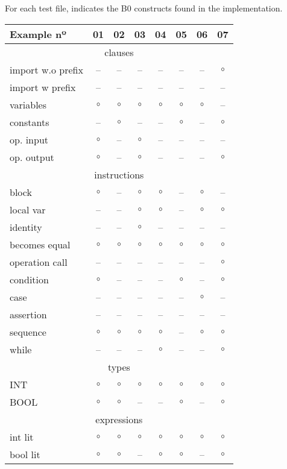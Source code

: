 \documentclass{llncs}
\begin{document}
For each test file, indicates the B0 constructs found in the implementation.
\begin{center}
\newcommand{\no}[0]{--}
\newcommand{\yes}[0]{$\circ$}
\begin{tabular}{|l|c|c|c|c|c|c|c|}
\hline
Example nº & 01 & 02 & 03 & 04 & 05 & 06 & 07 \\
\hline
\hline
\multicolumn{8}{|c|}{clauses} \\
\hline
import w.o prefix & \no & \no & \no & \no & \no & \no & \yes \\
import w prefix & \no & \no & \no & \no & \no & \no & \no \\
variables & \yes & \yes & \yes & \yes & \yes & \yes & \no \\
constants & \no & \yes & \no & \no & \yes & \no & \yes \\
op. input & \yes & \no & \yes & \no & \no & \no & \no \\
op. output & \yes & \no & \yes & \no & \no & \no & \yes \\
\hline
\multicolumn{8}{|c|}{instructions} \\
\hline
block & \yes & \no & \yes & \yes & \no & \yes & \no \\
local var & \no & \no & \yes & \yes & \no & \yes & \yes \\
identity & \no & \no & \yes & \no & \no & \no & \no \\
becomes equal & \yes & \yes & \yes & \yes & \yes & \yes & \yes \\
operation call & \no & \no & \no & \no & \no & \no & \yes \\
condition & \yes & \no & \no & \no & \yes & \no & \yes \\
case & \no & \no & \no & \no & \no & \yes & \no \\
assertion & \no & \no & \no & \no & \no & \no & \no \\
sequence & \yes & \yes & \yes & \yes & \no & \yes & \yes \\
while & \no & \no & \no & \yes & \no & \no & \yes \\
\hline
\multicolumn{8}{|c|}{types} \\
\hline
INT & \yes & \yes & \yes & \yes & \yes & \yes & \yes \\
BOOL & \yes & \yes & \no & \no & \yes & \no & \yes \\
\hline
\multicolumn{8}{|c|}{expressions} \\
\hline
int lit & \yes & \yes & \yes & \yes & \yes & \yes & \yes \\
bool lit & \yes & \yes & \no & \yes & \yes & \no & \yes \\

\end{tabular}
\end{center}
\end{document}
